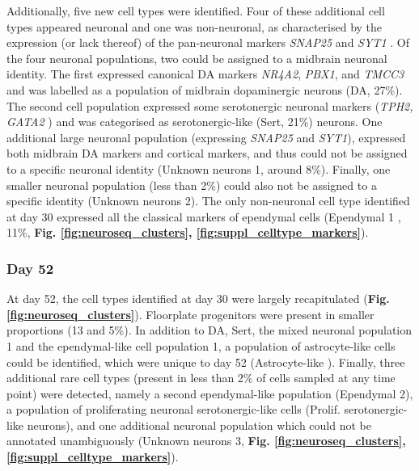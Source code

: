 Additionally, five new cell types were identified.
Four of these additional cell types appeared neuronal and one was non-neuronal, as characterised by the expression (or lack thereof) of the pan-neuronal markers \textit{SNAP25} and \textit{SYT1} \cite{arenas2015make}.
Of the four neuronal populations, two could be assigned to a midbrain neuronal identity.
The first expressed canonical DA markers \textit{NR4A2}, \textit{PBX1}, and \textit{TMCC3} \cite{la2016molecular, park2006acquisition, ramonet2012park9} and was labelled as a population of midbrain dopaminergic neurons (DA, 27\%).
The second cell population expressed some serotonergic neuronal markers (\textit{TPH2, GATA2} \cite{cummings2019serotonergic}) and was categorised as serotonergic-like (Sert, 21\%) neurons. 
One additional large neuronal population (expressing \textit{SNAP25} and \textit{SYT1}), expressed both midbrain DA markers and cortical markers, and thus could not be assigned to a specific neuronal identity (Unknown neurons 1, around 8\%).
Finally, one smaller neuronal population (less than 2\%) could also not be assigned to a specific identity (Unknown neurons 2). 
The only non-neuronal cell type identified at day 30 expressed all the classical markers of ependymal cells (Ependymal 1 \cite{campbell2017molecular}, 11\%, \textbf{Fig. \ref{fig:neuroseq_clusters}, \ref{fig:suppl_celltype_markers}}). 

\subsubsection{Day 52}

At day 52, the cell types identified at day 30 were largely recapitulated (\textbf{Fig. \ref{fig:neuroseq_clusters}}).
Floorplate progenitors were present in smaller proportions (13 and 5\%).
In addition to DA, Sert, the mixed neuronal population 1 and the ependymal-like cell population 1, a population of astrocyte-like cells could be identified, which were unique to day 52 (Astrocyte-like \cite{sloan2017human, zhang2016purification}). 
Finally, three additional rare cell types (present in less than 2\% of cells sampled at any time point) were detected, namely a second ependymal-like population (Ependymal 2), a population of proliferating neuronal serotonergic-like cells (Prolif. serotonergic-like neurons), and one additional neuronal population which could not be annotated unambiguously (Unknown neurons 3, \textbf{Fig. \ref{fig:neuroseq_clusters}, \ref{fig:suppl_celltype_markers}}). \\

